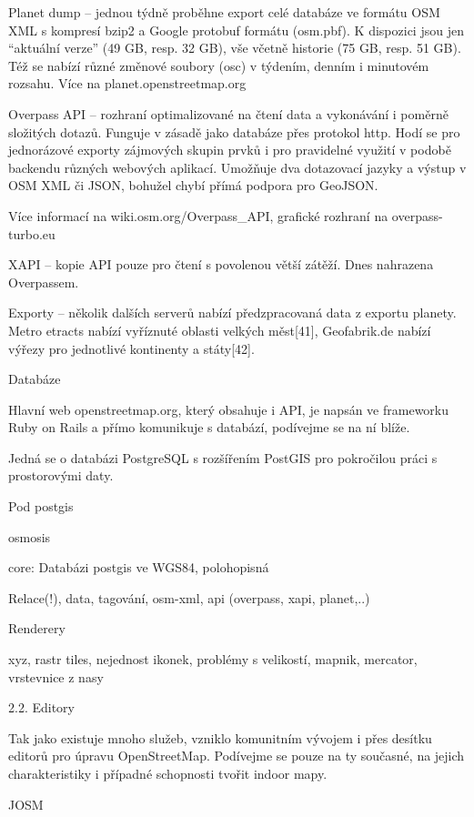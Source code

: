 Planet dump – jednou týdně proběhne export celé databáze ve formátu OSM XML s kompresí bzip2 a Google protobuf formátu (osm.pbf). K dispozici jsou jen “aktuální verze” (49 GB, resp. 32 GB), vše včetně historie (75 GB, resp. 51 GB). Též se nabízí různé změnové soubory (osc) v týdením, denním i minutovém rozsahu. Více na planet.openstreetmap.org

Overpass API – rozhraní optimalizované na čtení data a vykonávání i poměrně složitých dotazů. Funguje v zásadě jako databáze přes protokol http. Hodí se pro jednorázové exporty zájmových skupin prvků i pro pravidelné využití v podobě backendu různých webových aplikací. Umožňuje dva dotazovací jazyky a výstup v OSM XML či JSON, bohužel chybí přímá podpora pro GeoJSON. 

Více informací na wiki.osm.org/Overpass\_API, grafické rozhraní na overpass-turbo.eu

XAPI – kopie API pouze pro čtení s povolenou větší zátěží. Dnes nahrazena Overpassem.

Exporty – několik dalších serverů nabízí předzpracovaná data z exportu planety. Metro etracts nabízí vyříznuté oblasti velkých měst[41], Geofabrik.de nabízí výřezy pro jednotlivé kontinenty a státy[42].

Databáze



Hlavní web openstreetmap.org, který obsahuje i API, je napsán ve frameworku Ruby on Rails a přímo komunikuje s databází, podívejme se na ní blíže.

Jedná se o databázi PostgreSQL s rozšířením PostGIS pro pokročilou práci s prostorovými daty.

Pod postgis

osmosis

core: Databázi postgis ve WGS84, polohopisná

Relace(!), data, tagování, osm-xml, api (overpass, xapi, planet,..)

Renderery



xyz, rastr tiles, nejednost ikonek, problémy s velikostí, mapnik, mercator, vrstevnice z nasy

2.2. Editory



Tak jako existuje mnoho služeb, vzniklo komunitním vývojem i přes desítku editorů pro úpravu OpenStreetMap. Podívejme se pouze na ty současné, na jejich charakteristiky i případné schopnosti tvořit indoor mapy.

JOSM



